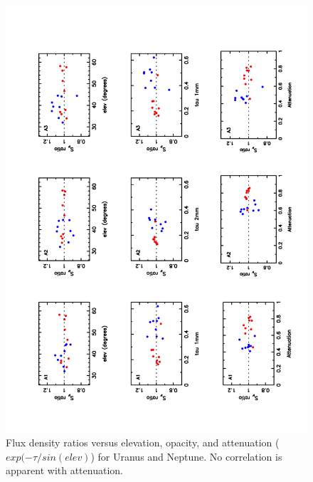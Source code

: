 \begin{figure}
\begin{center}
  \includegraphics[clip, angle=-90, scale=0.6]{Figures/Ura_Nep_ratio_vs_elev_tau_attenuation_r9_r10.pdf}
  \caption{Flux density ratios versus elevation, opacity, and attenuation ($exp(-\tau/sin(elev)$) for Uranus and Neptune.
    No correlation is apparent with attenuation.}
\label{fig:ratio_vs_att}
\end{center}
\end{figure}


